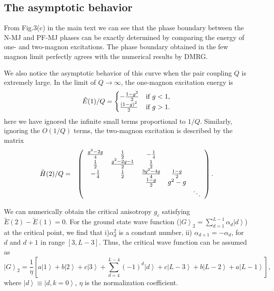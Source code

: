 \documentclass[article,10pt,onecolumn,superscriptaddress,floatfix]{revtex4}
\begin{document}
\subsection{The asymptotic behavior}
From Fig.3(c) in the main text we can see that the phase boundary between the N-MJ and PF-MJ phases can be exactly determined by comparing the energy of one- and two-magnon excitations. The phase boundary obtained in the few magnon limit perfectly agrees with the numerical results by DMRG.

We also notice the asymptotic behavior of this curve when the pair coupling $Q$ is extremely large. In the limit of $Q\rightarrow\infty$, the one-magnon excitation energy is
\begin{eqnarray}\label{eq:e1_q}
\centering
\tilde{E}(1)/Q =
\begin{cases}
-\frac{1-g^{2}}{2} &  \text{if $g<1$,} \\
\frac{\left(1-g\right)^{2}}{2}  &  \text{if $g>1$.}
\end{cases}
\end{eqnarray}
here we have ignored the infinite small terms proportional to $1/Q$. Similarly, ignoring the $O(1/Q)$ terms, the two-magnon excitation is described by the matrix
\begin{eqnarray}
\centering
\label{H2overQ}
\tilde{H}(2)/Q	=
&&\left(\begin{array}{cccccccc}
\frac{g^{2}-2g}{4} & \frac{1}{2} & -\frac{1}{4}\\
\frac{1}{2} & \frac{g^{2}-2g-1}{2} & \frac{1}{2}\\
-\frac{1}{4} & \frac{1}{2} & \frac{3g^{2}-4g}{4} & \frac{1-g}{2}\\
&  & \frac{1-g}{2} & g^{2}-g & \\
& & & & \ddots
\end{array}\right).
\end{eqnarray}

We can numerically obtain the critical anisotropy $g_c$ satisfying $\tilde{E}(2)-\tilde{E}(1)=0$.  For the ground state wave function ($\left|G\right\rangle_2 =\sum_{d=1}^{L-1} \alpha_{d}\left|d\right\rangle$) at the critical point, we find that i)$\alpha_{d}^2$ is a constant number, ii) $\alpha_{d+1} = -\alpha_d$,  for $d$ and $d+1$ in range $[3, L-3]$. Thus, the critical wave function can be assumed as
\begin{equation}
\left|G\right\rangle_2 =\frac{1}{\eta}\left[ a\left|1\right\rangle
+ b\left|2\right\rangle + c\left|3\right\rangle + \sum_{d=4}^{L-4}\left(-1\right)^{d}\left|d\right\rangle
+ c\left|L-3\right\rangle
+b\left|L-2\right\rangle
+a\left|L-1\right\rangle\right],
\end{equation}
where $\left|d\right\rangle\equiv\left|d,k=0\right\rangle$, $\eta$ is the normalization coefficient.
\end{document}
